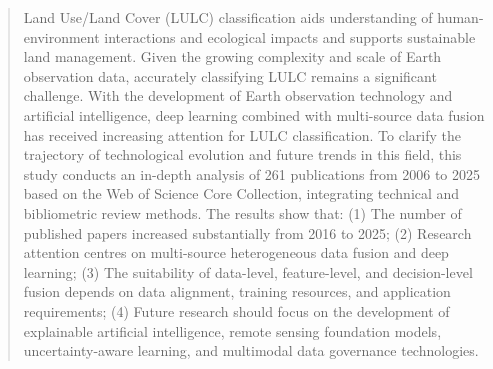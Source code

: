 \documentclass[]{interact}
\theoremstyle{plain}%
\theoremstyle{definition}
\theoremstyle{remark}
\DeclareRobustCommand{\DIFadd}[1]{{\protect\color{DIFaddcolor}\uwave{#1}}}
\DeclareRobustCommand{\DIFdel}[1]{{\protect\color{DIFdelcolor}\sout{#1}}}
\def\DIFadd#1{#1}%
\def\DIFdel#1{}%
\begin{document}
\begin{abstract}
Land Use/Land Cover \DIFdel{Change} (\DIFdel{LULCC}\hspace{0.33em}\DIFadd{LULC}) \DIFdel{is} \DIFdel{essential} \DIFdel{to} \DIFdel{understand} \DIFadd{classification} \DIFadd{aids} \DIFadd{understanding} \DIFadd{of} human-environment interactions\DIFdel{,} \DIFadd{and} ecological impacts\DIFdel{,} and \DIFadd{supports} sustainable land management. Given the growing complexity and scale of \DIFdel{LULCC} \DIFdel{dynamics} \DIFadd{Earth} \DIFadd{observation} \DIFadd{data}, accurately \DIFdel{capturing} \DIFdel{these} \DIFdel{processes} \DIFadd{classifying} \DIFadd{LULC} remains a significant challenge. With the development of \DIFdel{earth} \DIFadd{Earth} observation technology and artificial intelligence, deep learning combined with multi-source data fusion has \DIFdel{become} \DIFdel{the} \DIFdel{core} \DIFdel{driving} \DIFdel{force} \DIFadd{received} \DIFadd{increasing} \DIFadd{attention} for \DIFdel{the} \DIFdel{LULCC} \DIFdel{simulation} \DIFadd{LULC} \DIFadd{classification}. To clarify the trajectory of technological evolution and future trends in this field, this study conducts an in-depth analysis of 261 \DIFdel{core} \DIFdel{literatures} \DIFdel{published} \DIFadd{publications} from 2006 to 2025 based on the Web of Science Core Collection, integrating \DIFdel{systematic} \DIFadd{technical} and bibliometric review methods. \DIFdel{Our} \DIFadd{The} results show that: (1) The number of published papers \DIFdel{in} \DIFdel{this} \DIFdel{field} \DIFdel{has} \DIFdel{witnessed} \DIFdel{an} \DIFdel{exponential} \DIFdel{growth} \DIFdel{since} \DIFadd{increased} \DIFadd{substantially} \DIFadd{from} 2016 \DIFadd{to} \DIFadd{2025}; (2) \DIFdel{In} \DIFdel{terms} \DIFdel{of} \DIFdel{technological} \DIFdel{paradigms}\DIFdel{,} \DIFdel{the} \DIFdel{research} \DIFdel{focus} \DIFdel{has} \DIFdel{undergone} \DIFdel{a} \DIFdel{fundamental} \DIFdel{shift} \DIFdel{from} \DIFdel{single} \DIFdel{data} \DIFdel{source} \DIFdel{and} \DIFdel{traditional} \DIFdel{machine} \DIFdel{learning} \DIFdel{to} \DIFadd{Research} \DIFadd{attention} \DIFadd{centres} \DIFadd{on} multi-source heterogeneous data fusion and deep learning; (3) \DIFdel{Feature-level} \DIFdel{fusion} \DIFdel{has} \DIFdel{replaced} \DIFadd{The} \DIFadd{suitability} \DIFadd{of} data-level\DIFadd{,} \DIFadd{feature-level}\DIFadd{,} and decision-level fusion \DIFdel{as} \DIFdel{the} \DIFdel{current} \DIFdel{main} \DIFdel{strategy} \DIFadd{depends} \DIFadd{on} \DIFadd{data} \DIFadd{alignment}\DIFadd{,} \DIFadd{training} \DIFadd{resources}\DIFadd{,} \DIFadd{and} \DIFadd{application} \DIFadd{requirements}; (4) Future research should focus on the development of \DIFdel{Explainable} \DIFdel{Artificial} \DIFdel{Intelligence} \DIFadd{explainable} \DIFadd{artificial} \DIFadd{intelligence}, \DIFdel{general} remote sensing foundation models, \DIFadd{uncertainty-aware} \DIFadd{learning}\DIFadd{,} and \DIFdel{intelligent} \DIFadd{multimodal} data governance technologies.
\end{abstract}
\end{document}
